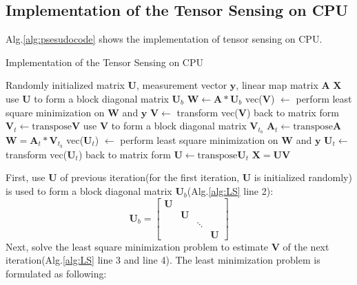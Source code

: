 \documentclass[futureinternet,article,submit,moreauthors,pdftex,10pt,a4paper]{Definitions/mdpi}
\theoremstyle{plain}
\theoremstyle{definition}
\theoremstyle{remark}
\begin{document}
\subsection{Implementation of the Tensor Sensing on CPU}
Alg.\ref{alg:psesudocode} shows the implementation of tensor sensing on CPU. 
\begin{algorithm}
\caption{Implementation of the Tensor Sensing on CPU}
\label{list:pseudocode}
\begin{algorithmic}[1]
    \Require Randomly initialized matrix $\mathbf{U}$, measurement vector $\mathbf{y}$, linear map matrix $\mathbf{A}$
    \Ensure $\mathbf{X}$
        \State use $\mathbf{U}$ to form a block diagonal matrix $\mathbf{U}_b$
        \State $\mathbf{W}\gets \mathbf{A} \ast \mathbf{U}_{b}$
        \State vec($\mathbf{V}$) $\gets$ perform least square minimization on $\mathbf{W}$ and $\mathbf{y}$
        \State $\mathbf{V} \gets$  transform vec($\mathbf{V}$) back to matrix form
        \State $\mathbf{V}_t \gets \text{transpose} \mathbf{V}$
        \State use $\mathbf{V}$ to form a block diagonal matrix $\mathbf{V}_{t_b}$
        \State $\mathbf{A}_t \gets \text{transpose} \mathbf{A}$
        \State $\mathbf{W} = \mathbf{A}_t \ast \mathbf{V}_{t_{b}}$
        \State vec($\mathbf{U}_t$) $\gets$ perform least square minimization on $\mathbf{W}$ and $\mathbf{y}$
        \State $\mathbf{U}_t \gets$  transform vec($\mathbf{U}_t$) back to matrix form
        \State $\mathbf{U} \gets \text{transpose} \mathbf{U}_t$
    \EndFor
    \State \Return $\mathbf{X} = \mathbf{U} \mathbf{V}$
    \end{algorithmic}
    \end{algorithm}
    First, use $\mathbf{U}$ of previous iteration(for the first iteration, $\mathbf{U}$ is initialized randomly) is used to form a block diagonal matrix $\mathbf{U}_b$(Alg.\ref{alg:LS} line 2):
    \begin{equation}
        \label{eqa:diag}
        \mathbf{U}_b = 
        \begin{bmatrix}
            \mathbf{U} & & & \\
            & \mathbf{U} & & \\
            & & \ddots & \\
            & & & \mathbf{U}
        \end{bmatrix}
    \end{equation}
    Next, solve the least square minimization problem to estimate $\mathbf{V}$ of the next iteration(Alg.\ref{alg:LS} line 3 and line 4). The least minimization problem is formulated as following:
\end{document}
